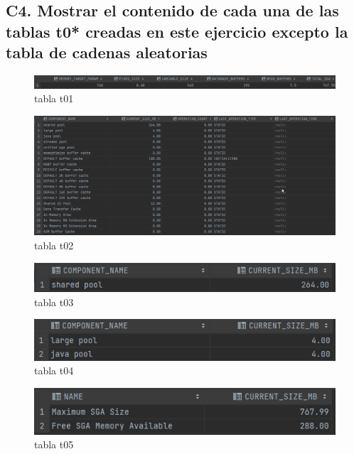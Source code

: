 \documentclass[journal]{IEEEtran}
\begin{document}
\subsection{C4. Mostrar el contenido de cada una de las tablas t0* creadas en este ejercicio excepto la tabla de cadenas aleatorias}
\begin{figure}[H]
  \centering
  \includegraphics[scale=.20]{captura_t01.png}
   \caption{tabla t01}
   \label{fig:validador_t01}
\end{figure}
\begin{figure}[H]
  \centering
  \includegraphics[scale=.20]{captura_t02.png}
   \caption{tabla t02}
   \label{fig:validador_t02}
\end{figure}
\begin{figure}[H]
  \centering
  \includegraphics[scale=.40]{captura_t03.png}
   \caption{tabla t03}
   \label{fig:validador_t03}
\end{figure}
\begin{figure}[H]
  \centering
  \includegraphics[scale=.40]{captura_t04.png}
   \caption{tabla t04}
   \label{fig:validador_t04}
\end{figure}
\begin{figure}[H]
  \centering
  \includegraphics[scale=.40]{captura_t05.png}
   \caption{tabla t05}
   \label{fig:validador_t05}
\end{figure}
\end{document}
